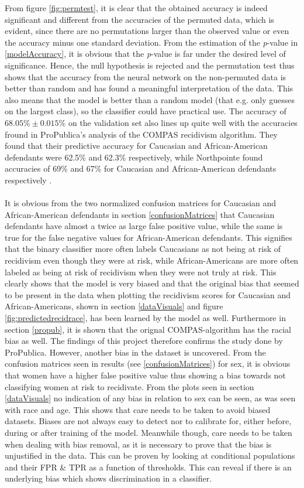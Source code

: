 \documentclass[11pt, fleqn, titlepage]{article}
\begin{document}
	From figure \ref{fig:permtest}, it is clear that the obtained accuracy is indeed significant and different from the accuracies of the permuted data, which is evident, since there are no permutations larger than the observed value or even the accuracy minus one standard deviation. From the estimation of the \textit{p}-value in \ref{modelAccuracy}, it is obvious that the \textit{p}-value is far under the desired level of significance. Hence, the null hypothesis is rejected and the permutation test thus shows that the accuracy from the neural network on the non-permuted data is better than random and has found a meaningful interpretation of the data. This also means that the model is better than a random model (that e.g. only guesses on the largest class), so the classifier could have practical use. The accuracy of $68.05\% \pm 0.015\%$ on the validation set also lines up quite well with the accuracies fround in ProPublica's analysis of the COMPAS recidivism algorithm. They found that their predictive accuracy for Caucasian and African-American defendants were 62.5\% and 62.3\% respectively, while Northpointe found accuracies of 69\% and 67\% for Caucasian and African-American defendants respectively \cite{propublicaAnalysis}. \\\\
	\noindent
	It is obvious from the two normalized confusion matrices for Caucasian and African-American defendants in section \ref{confusionMatrices} that Caucasian defendants have almost a twice as large false positive value, while the same is true for the false negative values for African-American defendants. This signifies that the binary classifier more often labels Caucasians as not being at risk of recidivism even though they were at risk, while African-Americans are more often labeled as being at risk of recidivism when they were not truly at risk. This clearly shows that the model is very biased and that the original bias that seemed to be present in the data when plotting the recidivism scores for Caucasian and African-Americans, shown in section \ref{dataVisuals} and figure \ref{fig:predictedrecidrace}, has been learned by the model as well. Furthermore in section \ref{propub}, it is shown that the orignal COMPAS-algorithm has the racial bias as well. The findings of this project therefore confirms the study done by ProPublica. However, another bias in the dataset is uncovered. From the confusion matrices seen in results (see \ref{confusionMatrices}) for sex, it is obvious that women have a higher false positive value thus showing a bias towards not classifying women at risk to recidivate. From the plots seen in section \ref{dataVisuals} no indication of any bias in relation to sex can be seen, as was seen with race and age. This shows that care needs to be taken to avoid biased datasets. Biases are not always easy to detect nor to calibrate for, either before, during or after training of the model. Meanwhile though, care needs to be taken when dealing with bias removal, as it is necessary to prove that the bias is unjustified in the data. This can be proven by looking at conditional populations and their FPR \& TPR as a function of thresholds. This can reveal if there is an underlying bias which shows discrimination in a classifier. 
	
\end{document}
